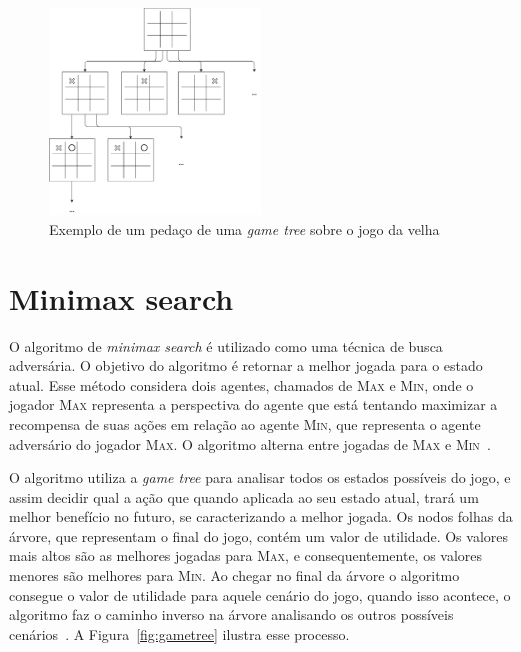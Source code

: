 \begin{figure}[ht]
	\centering
	\includegraphics[width=0.5\textwidth]{fig/jogodavelha.pdf}
	\caption{Exemplo de um pedaço de uma \textit{game tree} sobre o jogo da velha}
	\label{fig:jogodavelha}
\end{figure} 

\section{Minimax search}

O algoritmo de \textit{minimax search} é utilizado como uma técnica de busca adversária. 
O objetivo do algoritmo é retornar a melhor jogada para o estado atual. 
Esse método considera dois agentes, chamados de \textsc{Max} e \textsc{Min}, onde o jogador \textsc{Max} representa a perspectiva do agente que está tentando maximizar a recompensa de suas ações em relação ao agente \textsc{Min}, que representa o agente adversário do jogador \textsc{Max}. 
O algoritmo alterna entre jogadas de \textsc{Max} e \textsc{Min}~\cite{intelligence2003modern}. 

O algoritmo utiliza a \textit{game tree} para analisar todos os estados possíveis do jogo, e assim decidir qual a ação que quando aplicada ao seu estado atual, trará um melhor benefício no futuro, se caracterizando a melhor jogada. 
Os nodos folhas da árvore, que representam o final do jogo, contém um valor de utilidade. 
Os valores mais altos são as melhores jogadas para \textsc{Max}, e consequentemente, os valores menores são melhores para \textsc{Min}. 
Ao chegar no final da árvore o algoritmo consegue o valor de utilidade para aquele cenário do jogo, quando isso acontece, o algoritmo faz o caminho inverso na árvore analisando os outros possíveis cenários~\cite{intelligence2003modern}. 
A Figura~\ref{fig:gametree} ilustra esse processo.

